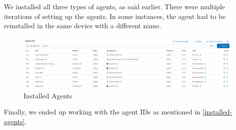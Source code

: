 We installed all three types of agents, as said earlier. There were multiple iterations of setting up the agents. In some instances, the agent had to be reinstalled in the same device with a different name.
\begin{figure}[H]
    \centering
    \includegraphics[width=\textwidth]{images/setup/all-agents.png}
    \caption{Installed Agents}
    \label{fig:installed-agents}
\end{figure}

Finally, we ended up working with the agent IDs as mentioned in \ref{installed-agents}.